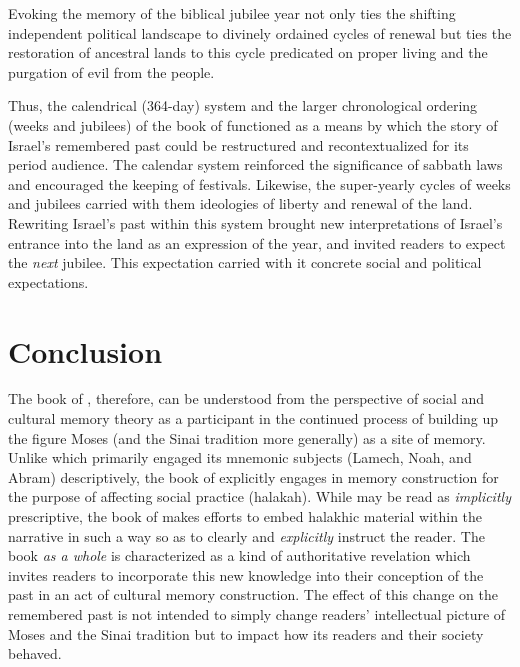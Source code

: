 
\noindent
Evoking the memory of the biblical jubilee year not only ties the shifting independent political landscape to divinely ordained cycles of renewal but ties the restoration of ancestral lands to this cycle predicated on proper living and the purgation of evil from the people. 

Thus, the calendrical (364-day) system and the larger chronological ordering (weeks and jubilees) of the book of \jub functioned as a means by which the story of Israel's remembered past could be restructured and recontextualized for its \secondtemple period audience. The calendar system reinforced the significance of sabbath laws and encouraged the keeping of festivals. Likewise, the super-yearly cycles of weeks and jubilees carried with them ideologies of liberty and renewal of the land. Rewriting Israel's past within this system brought new interpretations of Israel's entrance into the land as an expression of the \jub year, and invited readers to expect the \emph{next} jubilee. This expectation carried with it concrete social and political expectations.

\section{Conclusion}

The book of \jub, therefore, can be understood from the perspective of social and cultural memory theory as a participant in the continued process of building up the figure Moses (and the Sinai tradition more generally) as a site of memory. Unlike \ga which primarily engaged its mnemonic subjects (Lamech, Noah, and Abram) descriptively, the book of \jub explicitly engages in memory construction for the purpose of affecting social practice (halakah). While \ga may be read as \emph{implicitly} prescriptive, the book of \jub makes efforts to embed halakhic material within the narrative in such a way so as to clearly and \emph{explicitly} instruct the reader. The book \emph{as a whole} is characterized as a kind of authoritative revelation which invites readers to incorporate this new knowledge into their conception of the past in an act of cultural memory construction. The effect of this change on the remembered past is not intended to simply change readers' intellectual picture of Moses and the Sinai tradition but to impact how its readers and their society behaved.

